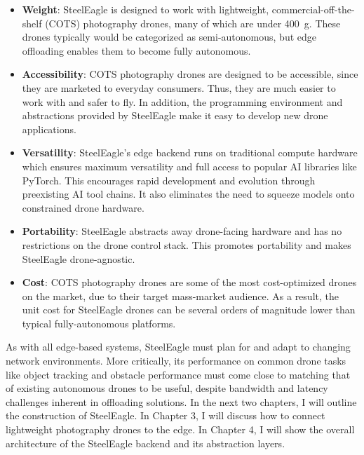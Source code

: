 \begin{itemize}
    \item \textbf{Weight}: SteelEagle is designed to work with lightweight, commercial-off-the-shelf (COTS) photography drones, many of which are under 400~g. These drones typically would be categorized as semi-autonomous, but edge offloading enables them to become fully autonomous.
    \item \textbf{Accessibility}: COTS photography drones are designed to be accessible, since they are marketed to everyday consumers. Thus, they are much easier to work with and safer to fly. In addition, the programming environment and abstractions provided by SteelEagle make it easy to develop new drone applications.
    \item \textbf{Versatility}: SteelEagle's edge backend runs on traditional compute hardware which ensures maximum versatility and full access to popular AI libraries like PyTorch. This encourages rapid development and evolution through preexisting AI tool chains. It also eliminates the  need to squeeze models onto constrained drone hardware.
    \item \textbf{Portability}: SteelEagle abstracts away drone-facing hardware and has no restrictions on the drone control stack. This promotes portability and makes SteelEagle drone-agnostic.
    \item \textbf{Cost}: COTS photography drones are some of the most cost-optimized drones on the market, due to their target mass-market audience. As a result, the unit cost for SteelEagle drones can be several orders of magnitude lower than typical fully-autonomous platforms.
\end{itemize}

As with all edge-based systems, SteelEagle must plan for and adapt to changing network environments. More critically, its performance on common drone tasks like object tracking and obstacle performance must come close to matching that of existing autonomous drones to be useful, despite bandwidth and latency challenges inherent in offloading solutions. In the next two chapters, I will outline the construction of SteelEagle. In Chapter 3, I will discuss how to connect lightweight photography drones to the edge. In Chapter 4, I will show the overall architecture of the SteelEagle backend and its abstraction layers. 



